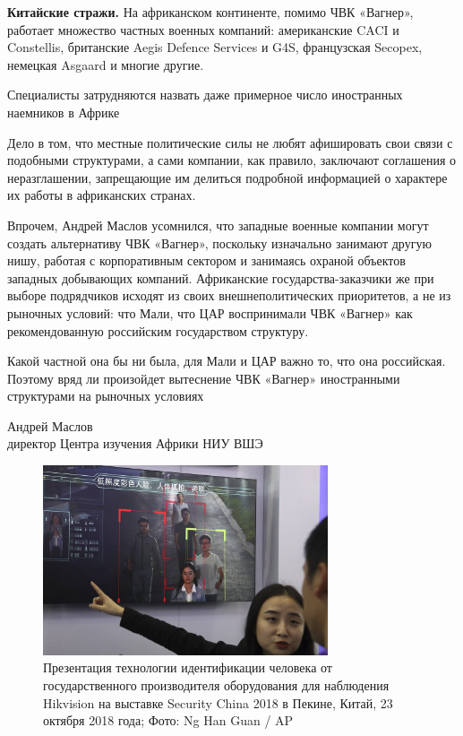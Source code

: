 \textbf{Китайские стражи.} На африканском континенте, помимо ЧВК «Вагнер», работает множество частных военных компаний: американские CACI и Constellis, британские Aegis Defence Services и G4S, французская Secopex, немецкая Asgaard и многие другие.

\begin{center}
    \Large
    Специалисты затрудняются назвать даже примерное число иностранных наемников в Африке
\end{center}

Дело в том, что местные политические силы не любят афишировать свои связи с подобными структурами, а сами компании, как правило, заключают соглашения о неразглашении, запрещающие им делиться подробной информацией о характере их работы в африканских странах.

Впрочем, Андрей Маслов усомнился, что западные военные компании могут создать альтернативу ЧВК «Вагнер», поскольку изначально занимают другую нишу, работая с корпоративным сектором и занимаясь охраной объектов западных добывающих компаний. Африканские государства-заказчики же при выборе подрядчиков исходят из своих внешнеполитических приоритетов, а не из рыночных условий: что Мали, что ЦАР воспринимали ЧВК «Вагнер» как рекомендованную российским государством структуру.

\begin{fancyquotes}
    Какой частной она бы ни была, для Мали и ЦАР важно то, что она российская. Поэтому вряд ли произойдет вытеснение ЧВК «Вагнер» иностранными структурами на рыночных условиях


    \begin{flushright}
        Андрей Маслов\\
        директор Центра изучения Африки НИУ ВШЭ
    \end{flushright}

\end{fancyquotes}


\begin{figure}[h]
    \centering
    \includegraphics[width=0.75\textwidth]{img/pmc_africa_5.jpg}
    \caption{Презентация технологии идентификации человека от государственного производителя оборудования для наблюдения Hikvision на выставке Security China 2018 в Пекине, Китай, 23 октября 2018 года; Фото: Ng Han Guan / AP}
\end{figure}

